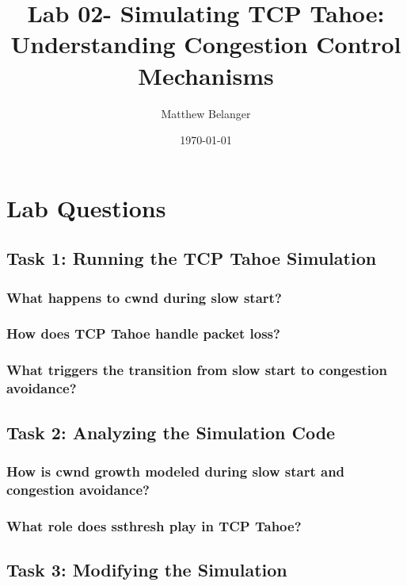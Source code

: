\documentclass{article}
\title{Lab 02- Simulating TCP Tahoe: Understanding Congestion Control Mechanisms}
\author{Matthew Belanger}
\date{\today}
\begin{document}
\maketitle


\section{Lab Questions}


\subsection{Task 1: Running the TCP Tahoe Simulation}

\subsubsection{What happens to cwnd during slow start?}

\subsubsection{How does TCP Tahoe handle packet loss?}

\subsubsection{What triggers the transition from slow start to congestion avoidance?}


\subsection{Task 2: Analyzing the Simulation Code}

\subsubsection{How is cwnd growth modeled during slow start and congestion avoidance?}

\subsubsection{What role does ssthresh play in TCP Tahoe?}


\subsection{Task 3: Modifying the Simulation}
\end{document}
